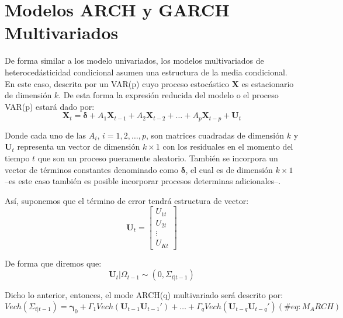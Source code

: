 \documentclass[
]{book}
\begin{document}
\hypertarget{modelos-arch-y-garch-multivariados}{%
\section{Modelos ARCH y GARCH Multivariados}\label{modelos-arch-y-garch-multivariados}}

De forma similar a los modelo univariados, los modelos multivariados de heterocedásticidad condicional asumen una estructura de la media condicional. En este caso, descrita por un VAR(p) cuyo proceso estocástico \(\mathbf{X}\) es estacionario de dimensión \(k\). De esta forma la expresión reducida del modelo o el proceso VAR(p) estará dado por:
\begin{equation}
    \mathbf{X}_t = \mathbf{\delta} + A_1 \mathbf{X}_{t-1} + A_2 \mathbf{X}_{t-2} + \ldots + A_p \mathbf{X}_{t-p} + \mathbf{U}_{t}
\end{equation}

Donde cada uno de las \(A_i\), \(i = 1, 2, \ldots, p\), son matrices cuadradas de dimensión \(k\) y \(\mathbf{U}_t\) representa un vector de dimensión \(k \times 1\) con los residuales en el momento del tiempo \(t\) que son un proceso pueramente aleatorio. También se incorpora un vector de términos constantes denominado como \(\mathbf{\delta}\), el cual es de dimensión \(k \times 1\) --es este caso también es posible incorporar procesos determinas adicionales--.

Así, suponemos que el término de error tendrá estructura de vector:
\begin{equation*}
    \mathbf{U}_t = 
    \begin{bmatrix}
    U_{1t} \\ U_{2t} \\ \vdots \\ U_{Kt}
    \end{bmatrix}
\end{equation*}

De forma que diremos que:
\begin{equation*}
    \mathbf{U}_t | \Omega_{t-1} \sim (0, \Sigma_{t | t-1})
\end{equation*}

Dicho lo anterior, entonces, el mode ARCH(q) multivariado será descrito por:
\begin{equation}
    Vech(\Sigma_{t | t-1}) = \boldsymbol{\gamma}_0 + \Gamma_1 Vech(\mathbf{U}_{t-1} \mathbf{U}_{t-1}') + \ldots + \Gamma_q Vech(\mathbf{U}_{t-q} \mathbf{U}_{t-q}')
    (\#eq:M_ARCH)
\end{equation}
\end{document}
